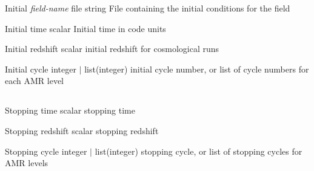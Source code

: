\documentclass{book}
\begin{document}
\Parameter
{Initial}
{\textit{field-name}}
{file}
{string}
{}
{File containing the initial conditions for the field}
{}
{}

\Parameter
{Initial}
{}
{time}
{scalar}
{}
{Initial time in code units}
{}
{}

\Parameter
{Initial}
{}
{redshift}
{scalar}
{}
{initial redshift for cosmological runs}
{}
{}

\Parameter
{Initial}
{}
{cycle}
{integer $|$ list(integer)}
{}
{initial cycle number, or list of cycle numbers for each AMR level}
{}
{}

\subsection{}

\Parameter
{Stopping}
{}
{time}
{scalar}
{}
{stopping time}
{}
{}

\Parameter
{Stopping}
{}
{redshift}
{scalar}
{}
{stopping redshift}
{}
{}
{}

\Parameter
{Stopping}
{}
{cycle}
{integer $|$ list(integer)}
{}
{stopping cycle, or list of stopping cycles for AMR levels}
{}


\subsection{}
\end{document}
